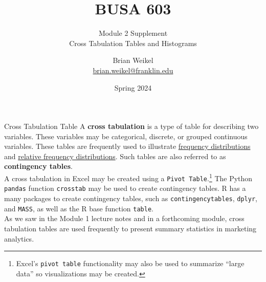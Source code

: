 \documentclass[pdf]{beamer}
\title{BUSA 603}
\subtitle{Module 2 Supplement \\  Cross Tabulation Tables and Histograms}
\newcommand{\empr}[1]{{\color{franklinblue}\textbf{#1}}}
\theoremstyle{remark}
\theoremstyle{definition}
\begin{document}
\author[B. Weikel, Franklin University]{
	\begin{tabular}{c} 
	\Large
	Brian Weikel\\
    \footnotesize \href{mailto:brian.weikel@franklin.edu}{brian.weikel@franklin.edu}
    \vspace{1ex}
\end{tabular}
\vspace{-4ex}}


\date{Spring 2024}%

\begin{noheadline}
\begin{frame}[t]\maketitle\end{frame}
\end{noheadline}

\begin{frame}[t]{Cross Tabulation Table}
A \empr{cross tabulation} is a type of table for describing two variables.  These variables may be categorical, discrete, or grouped continuous variables.  These tables are frequently used to illustrate \underline{frequency distributions} and \underline{relative frequency distributions}. Such tables are also referred to as \empr{contingency tables}. \\
\vspace{1.5ex}
A cross tabulation in Excel may be created using a \texttt{Pivot Table}.\footnote{Excel's \texttt{pivot table} functionality may also be used to summarize ``large data'' so visualizations may be created.}  The Python \texttt{pandas} function \texttt{crosstab} may be used to create contingency tables.  R has a many packages to create contingency tables, such as \texttt{contingencytables}, \texttt{dplyr}, and \texttt{MASS}, as well as the R base function \texttt{table}. \\
\vspace{1.5ex}
As we saw in the Module 1 lecture notes and in a forthcoming module, cross tabulation tables are used frequently to present summary statistics in marketing analytics.  \\
\end{frame}
\end{document}
